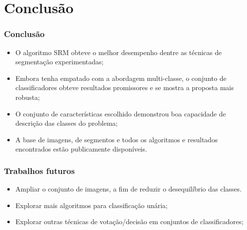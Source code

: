 \documentclass[t]{beamer}
\begin{document}

\section{Conclusão}

\begin{frame}[c]
	\frametitle{Conclusão}

	\begin{itemize}
		\item O algoritmo SRM obteve o melhor desempenho dentre as técnicas de segmentação experimentadas;
		\item Embora tenha empatado com a abordagem multi-classe, o conjunto de classificadores obteve resultados promissores e se mostra a proposta mais robusta;
		\item O conjunto de características escolhido demonstrou boa capacidade de descrição das classes do problema;
		\item A base de imagens, de segmentos e todos os algoritmos e resultados encontrados estão publicamente disponíveis.
	\end{itemize}
\end{frame}

\begin{frame}[c]
	\frametitle{Trabalhos futuros}

	\begin{itemize}
		\item Ampliar o conjunto de imagens, a fim de reduzir o desequilíbrio das classes.
		\item Explorar mais algoritmos para classificação unária;
		\item Explorar outras técnicas de votação/decisão em conjuntos de classificadores;
	\end{itemize}
\end{frame}



%	
%	
\end{document}
